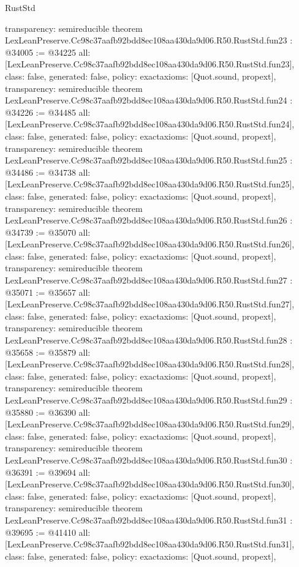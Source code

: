 \begin{lexlean}{RustStd}
\begin{coremodule}
{  transparency: semireducible
}
theorem LexLeanPreserve.Cc98c37aafb92bdd8ec108aa430da9d06.R50.RustStd.fun23 : @34005 := @34225 {
  all: [LexLeanPreserve.Cc98c37aafb92bdd8ec108aa430da9d06.R50.RustStd.fun23],
  class: false,
  generated: false,
  policy: exact{axioms: [Quot.sound, propext]},
  transparency: semireducible
}
theorem LexLeanPreserve.Cc98c37aafb92bdd8ec108aa430da9d06.R50.RustStd.fun24 : @34226 := @34485 {
  all: [LexLeanPreserve.Cc98c37aafb92bdd8ec108aa430da9d06.R50.RustStd.fun24],
  class: false,
  generated: false,
  policy: exact{axioms: [Quot.sound, propext]},
  transparency: semireducible
}
theorem LexLeanPreserve.Cc98c37aafb92bdd8ec108aa430da9d06.R50.RustStd.fun25 : @34486 := @34738 {
  all: [LexLeanPreserve.Cc98c37aafb92bdd8ec108aa430da9d06.R50.RustStd.fun25],
  class: false,
  generated: false,
  policy: exact{axioms: [Quot.sound, propext]},
  transparency: semireducible
}
theorem LexLeanPreserve.Cc98c37aafb92bdd8ec108aa430da9d06.R50.RustStd.fun26 : @34739 := @35070 {
  all: [LexLeanPreserve.Cc98c37aafb92bdd8ec108aa430da9d06.R50.RustStd.fun26],
  class: false,
  generated: false,
  policy: exact{axioms: [Quot.sound, propext]},
  transparency: semireducible
}
theorem LexLeanPreserve.Cc98c37aafb92bdd8ec108aa430da9d06.R50.RustStd.fun27 : @35071 := @35657 {
  all: [LexLeanPreserve.Cc98c37aafb92bdd8ec108aa430da9d06.R50.RustStd.fun27],
  class: false,
  generated: false,
  policy: exact{axioms: [Quot.sound, propext]},
  transparency: semireducible
}
theorem LexLeanPreserve.Cc98c37aafb92bdd8ec108aa430da9d06.R50.RustStd.fun28 : @35658 := @35879 {
  all: [LexLeanPreserve.Cc98c37aafb92bdd8ec108aa430da9d06.R50.RustStd.fun28],
  class: false,
  generated: false,
  policy: exact{axioms: [Quot.sound, propext]},
  transparency: semireducible
}
theorem LexLeanPreserve.Cc98c37aafb92bdd8ec108aa430da9d06.R50.RustStd.fun29 : @35880 := @36390 {
  all: [LexLeanPreserve.Cc98c37aafb92bdd8ec108aa430da9d06.R50.RustStd.fun29],
  class: false,
  generated: false,
  policy: exact{axioms: [Quot.sound, propext]},
  transparency: semireducible
}
theorem LexLeanPreserve.Cc98c37aafb92bdd8ec108aa430da9d06.R50.RustStd.fun30 : @36391 := @39694 {
  all: [LexLeanPreserve.Cc98c37aafb92bdd8ec108aa430da9d06.R50.RustStd.fun30],
  class: false,
  generated: false,
  policy: exact{axioms: [Quot.sound, propext]},
  transparency: semireducible
}
theorem LexLeanPreserve.Cc98c37aafb92bdd8ec108aa430da9d06.R50.RustStd.fun31 : @39695 := @41410 {
  all: [LexLeanPreserve.Cc98c37aafb92bdd8ec108aa430da9d06.R50.RustStd.fun31],
  class: false,
  generated: false,
  policy: exact{axioms: [Quot.sound, propext]},
}
\end{coremodule}
\end{lexlean}
